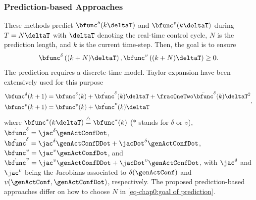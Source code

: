 \subsubsection{Prediction-based Approaches}
These methods predict $\bfunc^{\delta}(k\deltaT)$ and $\bfunc^{v}(k\deltaT)$ during $T=N\deltaT$  with $\deltaT$ denoting the real-time control cycle, $N$ is the prediction length, and $k$ is the current time-step. Then, the goal is to ensure
\begin{equation}\label{eq-chap0:goal of prediction}
	\bfunc^{\delta}\left((k+N)\deltaT\right),\bfunc^{v}\left((k+N)\deltaT\right)\geq0.
\end{equation} 
The prediction requires  a discrete-time model. Taylor expansion have been extensively used for this purpose
\begin{align}\label{eq-chap0:taylor expansion}
	\begin{split}
		\bfunc^{\delta}(k+1) &= \bfunc^{\delta}(k) + \dot{\bfunc}^{\delta}(k)\deltaT + \fracOneTwo\ddot{\bfunc}^{\delta}(k)\deltaT^2 \\ 
		\bfunc^{v}(k+1) &= \bfunc^{v}(k) + \dot{\bfunc}^{v}(k)\deltaT 
	\end{split},	 
\end{align}
where  $\bfunc^{*}(k\deltaT)\overset{\triangle}{=}\bfunc^{*}(k)$ ($*$ stands for $\delta$ or $v$), $\dot{\bfunc}^{\delta} = \jac^{\delta}\genActConfDot$, $\ddot{\bfunc}^{\delta} = \jac^{\delta}\genActConfDDot+\jacDot^{\delta}\genActConfDot$,  $\bfunc^{v} = \jac^{v}\genActConfDot$, and $\dot{\bfunc}^{v} =\jac^{v}\genActConfDDot+\jacDot^{v}\genActConfDot$, with $\jac^{\delta}$ and $\jac^{v}$ being the Jacobians associated to $\delta(\genActConf)$ and $v(\genActConf,\genActConfDot)$, respectively.
The proposed prediction-based approaches differ on how to choose $N$ in \cref{eq-chap0:goal of prediction}.  

